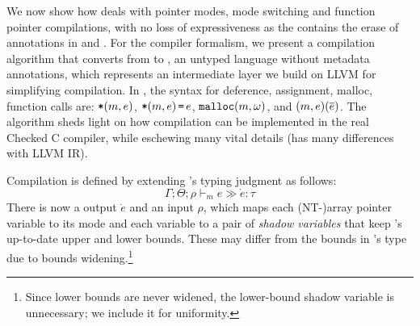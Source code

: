 We now show how \lang deals with pointer modes, mode switching and function pointer compilations, 
with no loss of expressiveness
as the \checkedc contains the erase of annotations in \cite{li22checkedc} and .
For the compiler formalism, 
we present a compilation algorithm that converts from
\lang to \elang, an untyped language without metadata
annotations, which represents an intermediate layer we build on LLVM for simplifying compilation. 
In \elang, the syntax for deference, assignment, malloc, function calls are: $\texttt{*}({m},{e})$, $\texttt{*}{(m,e)}\,\texttt{=}\, {e}$, 
$\mathtt{malloc}({m},{\omega})$, and ${(m,e)}({\overline{e}})$.
The algorithm sheds
  light on how compilation can be implemented in the real Checked C
  compiler, while eschewing many vital details (\elang has many 
  differences with LLVM IR).



Compilation is defined by extending \lang's
typing judgment as follows:
\[\Gamma;\Theta;\rho \vdash_m e \gg \dot e:\tau\]
There is now a \elang output $\dot e$ and an input $\rho$, which maps
each (NT-)array pointer variable to its mode and
each variable  to a pair of \emph{shadow
  variables} that keep 's up-to-date upper and lower bounds. 
These may differ from the bounds in 's type due to bounds
widening.\footnote{Since lower bounds are never widened, the
  lower-bound shadow variable is unnecessary; we include it for uniformity.} 


